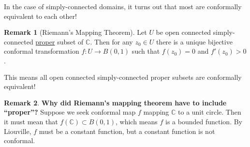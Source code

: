 \documentclass[a4paper, 12pt]{article}
\theoremstyle{definition}
\newtheorem{remark}{Remark}
\numberwithin{theorem}{section}
\numberwithin{definition}{section}
\numberwithin{exercise}{section}
\numberwithin{remark}{section}
\numberwithin{figure}{section}
\numberwithin{example}{section}
\newcommand{\C}{\mathbb{C}}
\begin{document}
In the case of simply-connected domains, it turns out that most are conformally equivalent to each other!
\begin{remark}[Riemann's Mapping Theorem]
    Let $U$ be open connected simply-connected \ul{proper} subset of $\C$.
    Then for any $z_0 \in U$ there is a unique bijective conformal transformation $f:U \rightarrow B\left( 0, 1 \right)$ such that $f(z_0) = 0$ and $f'(z_0) > 0$.

    This means all open connected simply-connected proper subsets are conformally equivalent!
\end{remark}
\begin{remark}
    \textbf{Why did Riemann's mapping theorem have to include ``proper''?}
    Suppose we seek conformal map $f$ mapping $\C$ to a unit circle.
    Then it must mean that $f(\C) \subset B\left( 0,1 \right)$,
    which means $f$ is a bounded function.
    By Liouville, $f$ must be a constant function, but a constant function is not conformal.
\end{remark}
\end{document}
